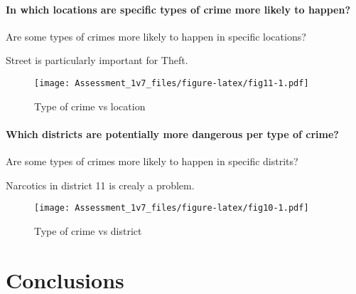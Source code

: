 \documentclass[]{article}
\let\oldparagraph\paragraph
\renewcommand{\paragraph}[1]{\oldparagraph{#1}\mbox{}}
\begin{document}
\paragraph{In which locations are specific types of crime more likely to
happen?}\label{in-which-locations-are-specific-types-of-crime-more-likely-to-happen}

Are some types of crimes more likely to happen in specific locations?

Street is particularly important for Theft.

\begin{figure}[htbp]
\centering
\texttt{[image: Assessment\_1v7\_files/figure-latex/fig11-1.pdf]}
\caption{Type of crime vs location}
\end{figure}

\paragraph{Which districts are potentially more dangerous per type of
crime?}\label{which-districts-are-potentially-more-dangerous-per-type-of-crime}

Are some types of crimes more likely to happen in specific distrits?

Narcotics in district 11 is crealy a problem.

\begin{figure}[htbp]
\centering
\texttt{[image: Assessment\_1v7\_files/figure-latex/fig10-1.pdf]}
\caption{Type of crime vs district}
\end{figure}

\section{Conclusions}\label{conclusions}
\end{document}
